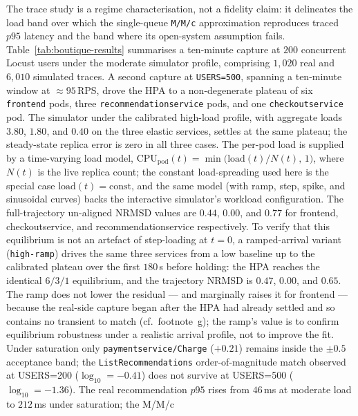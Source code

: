 \documentclass[ASNA,twocolumn]{USG}
\begin{document}
    The trace study is a regime characterisation, not a fidelity claim: it
    delineates the load band over which the single-queue \texttt{M/M/c}
    approximation reproduces traced $p95$ latency and the band where its
    open-system assumption fails.
    Table~\ref{tab:boutique-results} summarises a ten-minute
    capture at $200$ concurrent Locust users under the moderate
    simulator profile, comprising $1{,}020$ real and $6{,}010$
    simulated traces. A second capture at \texttt{USERS=500},
    spanning a ten-minute window at $\approx\!95\,$RPS,
    drove the HPA to a non-degenerate plateau of six \texttt{frontend}
    pods, three \texttt{recommendationservice} pods, and one
    \texttt{checkoutservice} pod. The simulator under the calibrated
    high-load profile, with aggregate loads $3.80$, $1.80$, and $0.40$
    on the three elastic services, settles at the same plateau; the
    steady-state replica error is zero in all three cases. The per-pod
    load is supplied by a time-varying load model,
    $\textrm{CPU}_\textrm{pod}(t) = \min\!\big(\textrm{load}(t)/N(t),\,1\big)$,
    where $N(t)$ is the live replica count; the constant load-spreading
    used here is the special case $\textrm{load}(t){=}\textrm{const}$,
    and the same model (with ramp, step, spike, and sinusoidal curves)
    backs the interactive simulator's workload configuration. The
    full-trajectory un-aligned NRMSD values are $0.44$, $0.00$, and
    $0.77$ for frontend, checkoutservice, and recommendationservice
    respectively. To verify that this equilibrium is not an artefact of
    step-loading at $t{=}0$, a ramped-arrival variant (\texttt{high-ramp})
    drives the same three services from a low baseline up to the
    calibrated plateau over the first $180\,$s before holding: the HPA
    reaches the identical $6/3/1$ equilibrium, and the trajectory NRMSD
    is $0.47$, $0.00$, and $0.65$. The ramp does not lower the residual
    --- and marginally raises it for frontend --- because the real-side
    capture began after the HPA had already settled and so contains no
    transient to match (cf.\ footnote~g); the ramp's value is to confirm
    equilibrium robustness under a realistic arrival profile, not to
    improve the fit.
    Under saturation only \texttt{paymentservice/Charge} ($+0.21$)
    remains inside the $\pm 0.5$ acceptance band; the
    \texttt{ListRecommendations} order-of-magnitude match observed at USERS=200
    ($\log_{10}=-0.41$) does not survive at USERS=500
    ($\log_{10}=-1.36$). The real recommendation $p95$ rises from
    $46\,$ms at moderate load to $212\,$ms under saturation; the M/M/c
\end{document}
